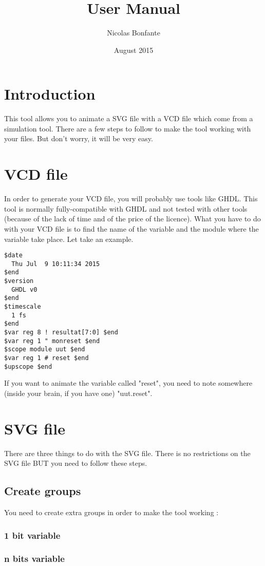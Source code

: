\documentclass{article}
\title{User Manual}
\author{Nicolas Bonfante}
\date{August 2015}
\begin{document}
\maketitle
\tableofcontents
\newpage

\section{Introduction}
This tool allows you to animate a SVG file with a VCD file which come from a simulation tool. There are a few steps to follow to make the tool working with your
files. But don't worry, it will be very easy.

\section{VCD file}
In order to generate your VCD file, you will probably use tools like GHDL. This tool is normally fully-compatible with GHDL and not tested with other tools (because
of the lack of time and of the price of the licence). 
What you have to do with your VCD file is to find the name of the variable and the module where the variable take place. Let take an example.
\begin{lstlisting}
$date
  Thu Jul  9 10:11:34 2015
$end
$version
  GHDL v0
$end
$timescale
  1 fs
$end
$var reg 8 ! resultat[7:0] $end
$var reg 1 " monreset $end
$scope module uut $end
$var reg 1 # reset $end
$upscope $end
\end{lstlisting}
If you want to animate the variable called "reset", you need to note somewhere (inside your brain, if you have one) "uut.reset".

\section{SVG file}
There are three things to do with the SVG file. There is no restrictions on the SVG file BUT you need to follow these steps.
\subsection{Create groups}
You need to create extra groups in order to make the tool working :
\subsubsection{1 bit variable}
\subsubsection{n bits variable}
\end{document}
